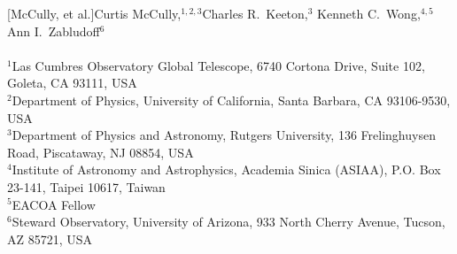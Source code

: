 [McCully, et al.]{Curtis McCully,$^{1, 2, 3}$\footnotemark[1]
  Charles R.\ Keeton,$^3$
  Kenneth C.\ Wong,$^{4, 5}$
  Ann I.\ Zabludoff$^6$\\
  \\
  $^1$Las Cumbres Observatory Global Telescope, 6740 Cortona Drive, Suite 102, Goleta, CA 93111, USA\\
  $^2$Department of Physics, University of California, Santa Barbara,
CA 93106-9530, USA\\
  $^3$Department of Physics and Astronomy, Rutgers University, 136 Frelinghuysen Road, Piscataway, NJ 08854, USA\\
  $^4$Institute of Astronomy and Astrophysics, Academia Sinica (ASIAA), P.O. Box 23-141, Taipei 10617, Taiwan\\
  $^5$EACOA Fellow\\
    $^6$Steward Observatory, University of Arizona, 933 North Cherry Avenue, Tucson, AZ 85721, USA\\}
  
  